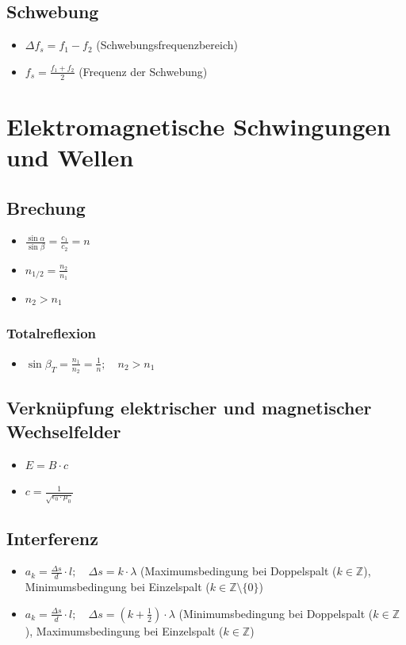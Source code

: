 \documentclass[paper = a4, twocolumn]{scrartcl}
\begin{document}
\subsection{Schwebung}
\begin{itemize}
\item
	\( \Delta f_s = f_1 - f_2 \) (Schwebungsfrequenzbereich)
\item
	\( f_s = \frac{f_1 + f_2}{2} \) (Frequenz der Schwebung)
\end{itemize}

\section{Elektromagnetische Schwingungen und Wellen}
\subsection{Brechung}
\begin{itemize}
\item
	\( \frac{\sin \alpha}{\sin \beta} = \frac{c_1}{c_2} = n \)
\item
	\( n_{1/2} = \frac{n_2}{n_1} \)
\item
	\( n_2 > n_1 \)
\end{itemize}

\subsubsection{Totalreflexion}
\begin{itemize}
\item
	\( \sin \beta_T = \frac{n_1}{n_2} = \frac{1}{n}; \quad n_2 > n_1 \)
\end{itemize}

\subsection{Verknüpfung elektrischer und magnetischer Wechselfelder}
\begin{itemize}
\item
	\( E = B \cdot c \)
\item
	\( c = \frac{1}{\sqrt{\epsilon_0 \cdot \mu_0}} \)
\end{itemize}

\subsection{Interferenz}
\begin{itemize}
\item
	\( a_k = \frac{\Delta s}{d} \cdot l; \quad \Delta s = k \cdot \lambda \)
	(Maximumsbedingung bei Doppelspalt (\( k \in \mathbb{Z} \)),
	Minimumsbedingung bei Einzelspalt (\( k \in \mathbb{Z}\setminus\{0\} \))
\item
	\( a_k = \frac{\Delta s}{d} \cdot l; \quad \Delta s = (k + \frac{1}{2})
	\cdot \lambda \) (Minimumsbedingung bei Doppelspalt (\( k \in
	\mathbb{Z} \)), Maximumsbedingung bei Einzelspalt (\( k
	\in \mathbb{Z} \))
\end{itemize}
\end{document}
